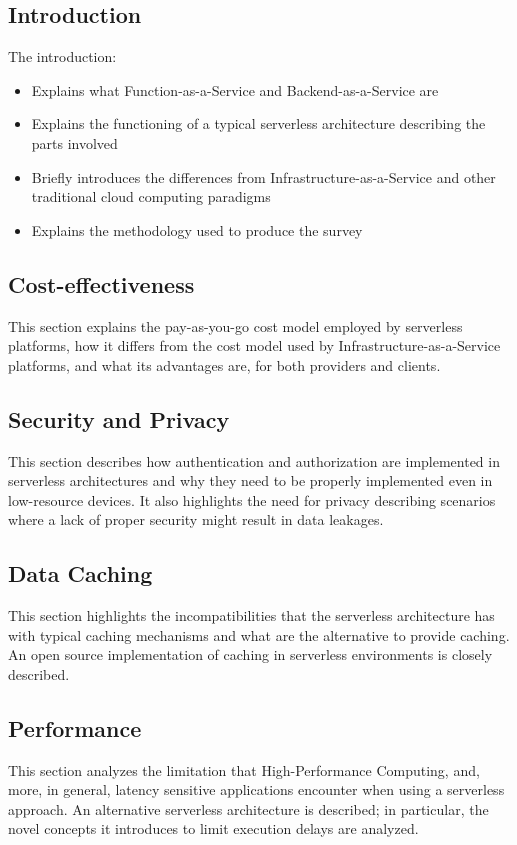 \documentclass{scrartcl}
\begin{document}
\subsection{Introduction}
The introduction:
\begin{itemize}
  \item Explains what Function-as-a-Service and Backend-as-a-Service are
  \item Explains the functioning of a typical serverless architecture describing the parts involved
  \item Briefly introduces the differences from Infrastructure-as-a-Service and other traditional cloud computing paradigms
  \item Explains the methodology used to produce the survey
\end{itemize}

\subsection{Cost-effectiveness}
This section explains the pay-as-you-go cost model employed by serverless platforms, how it differs from the cost model used by Infrastructure-as-a-Service platforms, and what its advantages are, for both providers and clients.

\subsection{Security and Privacy}
This section describes how authentication and authorization are implemented in serverless architectures and why they need to be properly implemented even in low-resource devices. It also highlights the need for privacy describing scenarios where a lack of proper security might result in data leakages.

\subsection{Data Caching}
This section highlights the incompatibilities that the serverless architecture has with typical caching mechanisms and what are the alternative to provide caching. An open source implementation of caching in serverless environments is closely described.

\subsection{Performance}
This section analyzes the limitation that High-Performance Computing, and, more, in general, latency sensitive applications encounter when using a serverless approach. An alternative serverless architecture is described; in particular, the novel concepts it introduces to limit execution delays are analyzed.
\end{document}
